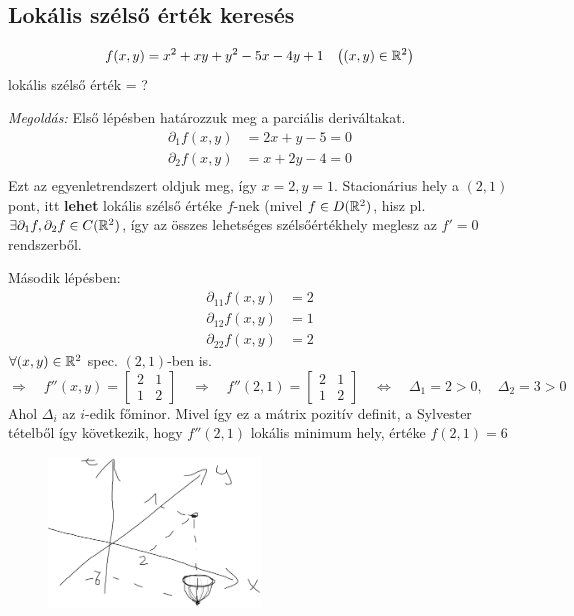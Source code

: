 \documentclass[a4paper,11.5pt]{article}
\begin{document}
	\subsection{Lokális szélső érték keresés}
	\begin{example}
		\[ f(x,y)=x^2+xy+y^2-5x-4y+1\quad \big((x,y)\in\mathbb{R}^2\big) \]
		lokális szélső érték = ?
		
		\textit{Megoldás:} Első lépésben határozzuk meg a parciális deriváltakat.
		\begin{align*}
			\partial_1f(x,y)&=2x+y-5 = 0\\
			\partial_2f(x,y)&=x+2y-4=0\\
		\end{align*}
		Ezt az egyenletrendszert oldjuk meg, így $x=2, y=1$. Stacionárius hely a $(2,1)$ pont, itt \textbf{lehet} lokális szélső értéke $f$-nek (mivel $f\in D(\mathbb{R}^2)$, hisz pl. $\exists \partial_1f,\partial_2f\in C(\mathbb{R}^2)$, így az összes lehetséges szélsőértékhely meglesz az $f'=0$ rendszerből.
		
		Második lépésben: 
		\begin{align*}
			\partial_{11}f(x,y)&=2 \\
			\partial_{12}f(x,y)&=1 \\
			\partial_{22}f(x,y)&=2 
		\end{align*} 
		$\forall(x,y)\in\mathbb{R}^2$ spec. $(2,1)$-ben is.
		\[ \Rightarrow\quad f''(x,y)=\begin{bmatrix}
			2&1\\
			1&2
		\end{bmatrix}\quad \Rightarrow\quad f''(2,1)=\begin{bmatrix}
			2&1\\
			1&2
		\end{bmatrix}\quad \Leftrightarrow\quad \varDelta_1=2>0,\quad \varDelta_2=3>0 \]
		Ahol $\varDelta_i$ az $i$-edik főminor. Mivel így ez a mátrix pozitív definit, a Sylvester tételből így következik, hogy $f''(2,1)$ lokális minimum hely, értéke $f(2,1)=6$
		\begin{figure}[H]
			\centering
			\includegraphics[height=4cm]{../2zh/kepek/38.png}
			\caption{}
		\end{figure}
	\end{example}
\end{document}
